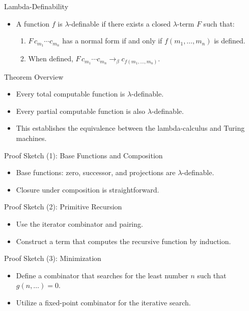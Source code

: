 \documentclass{beamer}
\begin{document}
\begin{frame}{Lambda-Definability}
  \begin{itemize}
    \item A function \(f\) is \(\lambda\)-definable if there exists a closed \(\lambda\)-term \(F\) such that:
      \begin{enumerate}
        \item \(F\,c_{m_1}\cdots c_{m_n}\) has a normal form if and only if \(f(m_1,\dots,m_n)\) is defined.
        \item When defined, \(F\,c_{m_1}\cdots c_{m_n} \rightarrow_\beta c_{f(m_1,\dots,m_n)}\).
      \end{enumerate}
  \end{itemize}
\end{frame}

\begin{frame}{Theorem Overview}
  \begin{itemize}
    \item Every total computable function is \(\lambda\)-definable.
    \item Every partial computable function is also \(\lambda\)-definable.
    \item This establishes the equivalence between the lambda-calculus and Turing machines.
  \end{itemize}
\end{frame}

\begin{frame}{Proof Sketch (1): Base Functions and Composition}
  \begin{itemize}
    \item Base functions: zero, successor, and projections are \(\lambda\)-definable.
    \item Closure under composition is straightforward.
  \end{itemize}
\end{frame}

\begin{frame}{Proof Sketch (2): Primitive Recursion}
  \begin{itemize}
    \item Use the iterator combinator and pairing.
    \item Construct a term that computes the recursive function by induction.
  \end{itemize}
\end{frame}

\begin{frame}{Proof Sketch (3): Minimization}
  \begin{itemize}
    \item Define a combinator that searches for the least number \(n\) such that \(g(n,\dots)=0\).
    \item Utilize a fixed-point combinator for the iterative search.
  \end{itemize}
\end{frame}
\end{document}
